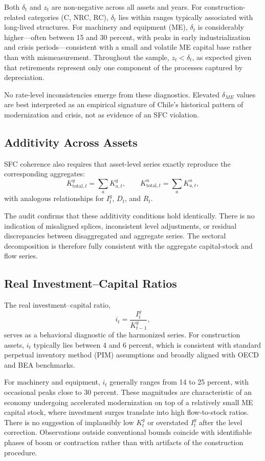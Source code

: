 Both \(\delta_t\) and \(z_t\) are non-negative across all assets and years. For construction-related categories (C, NRC, RC), \(\delta_t\) lies within ranges typically associated with long-lived structures. For machinery and equipment (ME), \(\delta_t\) is considerably higher---often between 15 and 30 percent, with peaks in early industrialization and crisis periods---consistent with a small and volatile ME capital base rather than with mismeasurement. Throughout the sample, \(z_t < \delta_t\), as expected given that retirements represent only one component of the processes captured by depreciation.

No rate-level inconsistencies emerge from these diagnostics. Elevated \(\delta_{ME}\) values are best interpreted as an empirical signature of Chile’s historical pattern of modernization and crisis, not as evidence of an SFC violation.

\subsection{Additivity Across Assets}

SFC coherence also requires that asset-level series exactly reproduce the corresponding aggregates:
\[
K^g_{\text{total},t} = \sum_a K^g_{a,t}, \qquad
K^n_{\text{total},t} = \sum_a K^n_{a,t},
\]
with analogous relationships for \(I^g_t\), \(D_t\), and \(R_t\).

The audit confirms that these additivity conditions hold identically. There is no indication of misaligned splices, inconsistent level adjustments, or residual discrepancies between disaggregated and aggregate series. The sectoral decomposition is therefore fully consistent with the aggregate capital-stock and flow series.

\subsection{Real Investment--Capital Ratios}

The real investment--capital ratio,
\[
i_t = \frac{I^g_t}{K^g_{t-1}},
\]
serves as a behavioral diagnostic of the harmonized series. For construction assets, \(i_t\) typically lies between 4 and 6 percent, which is consistent with standard perpetual inventory method (PIM) assumptions and broadly aligned with OECD and BEA benchmarks.

For machinery and equipment, \(i_t\) generally ranges from 14 to 25 percent, with occasional peaks close to 30 percent. These magnitudes are characteristic of an economy undergoing accelerated modernization on top of a relatively small ME capital stock, where investment surges translate into high flow-to-stock ratios. There is no suggestion of implausibly low \(K^g_t\) or overstated \(I^g_t\) after the level correction. Observations outside conventional bounds coincide with identifiable phases of boom or contraction rather than with artifacts of the construction procedure.

